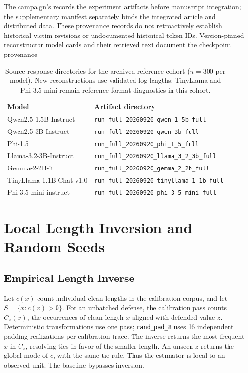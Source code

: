 \documentclass[electronics,article,submit,pdftex,moreauthors]{Definitions/mdpi}
\begin{document}
The campaign's  records the experiment artifacts before manuscript integration; the supplementary manifest separately binds the integrated article and distributed data. These provenance records do not retroactively establish historical victim revisions or undocumented historical token IDs. Version-pinned reconstructor model cards and their retrieved text document the checkpoint provenance.

\begin{table}[ht]
\centering
\caption{Source-response directories for the archived-reference cohort ($n=300$ per model). New reconstructions use validated log lengths; TinyLlama and Phi-3.5-mini remain reference-format diagnostics in this cohort.}
\label{tab:run_ids}
\begin{tabular}{l l}
\toprule
Model & Artifact directory \\
\midrule
Qwen2.5-1.5B-Instruct & \texttt{run\_full\_20260920\_qwen\_1\_5b\_full} \\
Qwen2.5-3B-Instruct & \texttt{run\_full\_20260920\_qwen\_3b\_full} \\
Phi-1.5 & \texttt{run\_full\_20260920\_phi\_1\_5\_full} \\
Llama-3.2-3B-Instruct & \texttt{run\_full\_20260920\_llama\_3\_2\_3b\_full} \\
Gemma-2-2B-it & \texttt{run\_full\_20260920\_gemma\_2\_2b\_full} \\
TinyLlama-1.1B-Chat-v1.0 & \texttt{run\_full\_20260920\_tinyllama\_1\_1b\_full} \\
Phi-3.5-mini-instruct & \texttt{run\_full\_20260920\_phi\_3\_5\_mini\_full} \\
\bottomrule
\end{tabular}
\end{table}

\section{Local Length Inversion and Random Seeds}\label{app:map-seeds}

\subsection{Empirical Length Inverse}
Let $c(x)$ count individual clean lengths in the calibration corpus, and let $S=\{x:c(x)>0\}$. For an unbatched defense, the calibration pass counts $C_z(x)$, the occurrences of clean length $x$ aligned with defended value $z$. Deterministic transformations use one pass; \texttt{rand\_pad\_8} uses 16 independent padding realizations per calibration trace. The inverse returns the most frequent $x$ in $C_z$, resolving ties in favor of the smaller length. An unseen $z$ returns the global mode of $c$, with the same tie rule. Thus the estimator is local to an observed unit. The baseline bypasses inversion.
\end{document}
